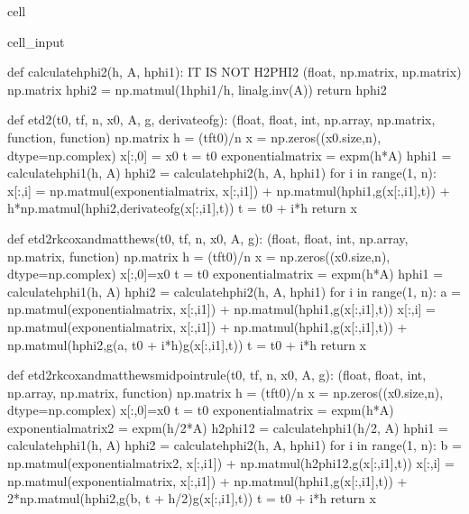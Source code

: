 \documentclass[letterpaper,10pt,english]{jupyterBook}
\begin{document}
\begin{sphinxuseclass}{cell}
\begin{sphinxVerbatimInput}
\begin{sphinxuseclass}{cell_input}
\begin{sphinxVerbatim}[commandchars=\\\{\}]
def calculate\PYGZus{}hphi2(h, A, hphi1):
    \PYGZsh{}IT IS NOT H2PHI2
    \PYGZsq{}\PYGZsq{}\PYGZsq{}(float, np.matrix, np.matrix) \PYGZhy{}\PYGZgt{} np.matrix\PYGZsq{}\PYGZsq{}\PYGZsq{}
    hphi2 = np.matmul(1\PYGZhy{}hphi1/h, linalg.inv(A))
    return hphi2

def etd2(t0, tf, n, x0, A, g, derivate\PYGZus{}of\PYGZus{}g):
    \PYGZsq{}\PYGZsq{}\PYGZsq{}(float, float, int, np.array, np.matrix, function, function) \PYGZhy{}\PYGZgt{} np.matrix\PYGZsq{}\PYGZsq{}\PYGZsq{}
    h = (tf\PYGZhy{}t0)/n
    x = np.zeros((x0.size,n), dtype=np.complex\PYGZus{})
    x[:,0] = x0
    t = t0
    exponential\PYGZus{}matrix = expm(\PYGZhy{}h*A)
    hphi1 = calculate\PYGZus{}hphi1(h, A)
    hphi2 = calculate\PYGZus{}hphi2(h, A, hphi1)
    for i in range(1, n):
        x[:,i] = np.matmul(exponential\PYGZus{}matrix, x[:,i\PYGZhy{}1]) + np.matmul(hphi1,g(x[:,i\PYGZhy{}1],t)) + h*np.matmul(hphi2,derivate\PYGZus{}of\PYGZus{}g(x[:,i\PYGZhy{}1],t))
        t = t0 + i*h
    return x

def etd2rk\PYGZus{}cox\PYGZus{}and\PYGZus{}matthews(t0, tf, n, x0, A, g):
    \PYGZsq{}\PYGZsq{}\PYGZsq{}(float, float, int, np.array, np.matrix, function) \PYGZhy{}\PYGZgt{} np.matrix\PYGZsq{}\PYGZsq{}\PYGZsq{}
    h = (tf\PYGZhy{}t0)/n
    x = np.zeros((x0.size,n), dtype=np.complex\PYGZus{})
    x[:,0]=x0
    t = t0
    exponential\PYGZus{}matrix = expm(\PYGZhy{}h*A)
    hphi1 = calculate\PYGZus{}hphi1(h, A)
    hphi2 = calculate\PYGZus{}hphi2(h, A, hphi1)
    for i in range(1, n):
        a = np.matmul(exponential\PYGZus{}matrix, x[:,i\PYGZhy{}1]) + np.matmul(hphi1,g(x[:,i\PYGZhy{}1],t))
        x[:,i] = np.matmul(exponential\PYGZus{}matrix, x[:,i\PYGZhy{}1]) + np.matmul(hphi1,g(x[:,i\PYGZhy{}1],t)) + np.matmul(hphi2,g(a, t0 + i*h)\PYGZhy{}g(x[:,i\PYGZhy{}1],t))
        t = t0 + i*h
    return x

def etd2rk\PYGZus{}cox\PYGZus{}and\PYGZus{}matthews\PYGZus{}midpoint\PYGZus{}rule(t0, tf, n, x0, A, g):
    \PYGZsq{}\PYGZsq{}\PYGZsq{}(float, float, int, np.array, np.matrix, function) \PYGZhy{}\PYGZgt{} np.matrix\PYGZsq{}\PYGZsq{}\PYGZsq{}
    h = (tf\PYGZhy{}t0)/n
    x = np.zeros((x0.size,n), dtype=np.complex\PYGZus{})
    x[:,0]=x0
    t = t0
    exponential\PYGZus{}matrix = expm(\PYGZhy{}h*A)
    exponential\PYGZus{}matrix\PYGZus{}2 = expm(\PYGZhy{}h/2*A)
    h\PYGZus{}2phi1\PYGZus{}2 = calculate\PYGZus{}hphi1(h/2, A)
    hphi1 = calculate\PYGZus{}hphi1(h, A)
    hphi2 = calculate\PYGZus{}hphi2(h, A, hphi1)
    for i in range(1, n):
        b = np.matmul(exponential\PYGZus{}matrix\PYGZus{}2, x[:,i\PYGZhy{}1]) + np.matmul(h\PYGZus{}2phi1\PYGZus{}2,g(x[:,i\PYGZhy{}1],t))
        x[:,i] = np.matmul(exponential\PYGZus{}matrix, x[:,i\PYGZhy{}1]) + np.matmul(hphi1,g(x[:,i\PYGZhy{}1],t)) + 2*np.matmul(hphi2,g(b, t + h/2)\PYGZhy{}g(x[:,i\PYGZhy{}1],t))
        t = t0 + i*h
    return x


\end{sphinxVerbatim}
\end{sphinxuseclass}
\end{sphinxVerbatimInput}
\end{sphinxuseclass}
\end{document}
